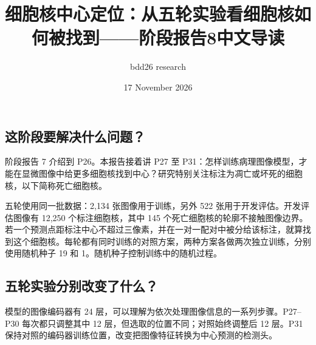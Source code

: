 \documentclass[
  11pt,
  fontset=fandol]{ctexart}
\title{细胞核中心定位：从五轮实验看细胞核如何被找到------阶段报告8中文导读}
\author{bdd26 research}
\date{17 November 2026}
\begin{document}
\maketitle

{
\setcounter{tocdepth}{2}
\tableofcontents
\newpage
}
\subsection{这阶段要解决什么问题？}\label{ux8fd9ux9636ux6bb5ux8981ux89e3ux51b3ux4ec0ux4e48ux95eeux9898}

阶段报告 7 介绍到 P26。本报告接着讲 P27 至
P31：怎样训练病理图像模型，才能在显微图像中给更多细胞核找到中心？研究特别关注标注为凋亡或坏死的细胞核，以下简称死亡细胞核。

五轮使用同一批数据：2,134 张图像用于训练，另外 522
张用于开发评估。开发评估图像有 12,250 个标注细胞核，其中 145
个死亡细胞核的轮廓不接触图像边界。若一个预测点距标注中心不超过三像素，并在一对一配对中被分给该标注，就算找到这个细胞核。每轮都有同时训练的对照方案，两种方案各做两次独立训练，分别使用随机种子
19 和 1。随机种子控制训练中的随机过程。

\subsection{五轮实验分别改变了什么？}\label{ux4e94ux8f6eux5b9eux9a8cux5206ux522bux6539ux53d8ux4e86ux4ec0ux4e48}

模型的图像编码器有 24
层，可以理解为依次处理图像信息的一系列步骤。P27--P30 每次都只调整其中 12
层，但选取的位置不同；对照始终调整后 12 层。P31
保持对照的编码器训练位置，改变把图像特征转换为中心预测的检测头。
\end{document}

